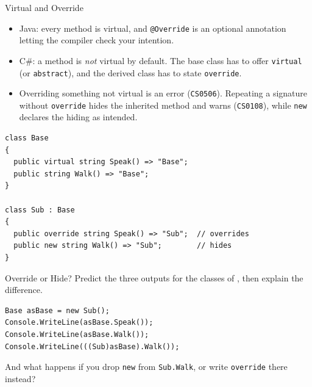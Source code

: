 \begin{frame}[fragile]{Virtual and Override}
  \begin{itemize}
    \item Java: every method is virtual, and \texttt{@Override} is an optional
      annotation letting the compiler check your intention.
    \item C\#: a method is \emph{not} virtual by default. The base class has to
      offer \texttt{virtual} (or \texttt{abstract}), and the derived class has to
      state \texttt{override}.
    \item Overriding something not virtual is an error (\texttt{CS0506}).
      Repeating a signature without \texttt{override} hides the inherited method
      and warns (\texttt{CS0108}), while \texttt{new} declares the hiding as
      intended.
  \end{itemize}
  \vspace{1ex}

  \begin{lstlisting}[basicstyle=\scriptsize\ttfamily]
class Base
{
  public virtual string Speak() => "Base";
  public string Walk() => "Base";
}

class Sub : Base
{
  public override string Speak() => "Sub";  // overrides
  public new string Walk() => "Sub";        // hides
}
  \end{lstlisting}
\end{frame}

\begin{exerciseframe}{Override or Hide?}
  Predict the three outputs for the classes of , then
  explain the difference.
  \vspace{1ex}

  \begin{lstlisting}[basicstyle=\scriptsize\ttfamily]
Base asBase = new Sub();
Console.WriteLine(asBase.Speak());
Console.WriteLine(asBase.Walk());
Console.WriteLine(((Sub)asBase).Walk());
  \end{lstlisting}
  \vspace{1ex}

  And what happens if you drop \texttt{new} from \texttt{Sub.Walk}, or write
  \texttt{override} there instead?
\end{exerciseframe}

